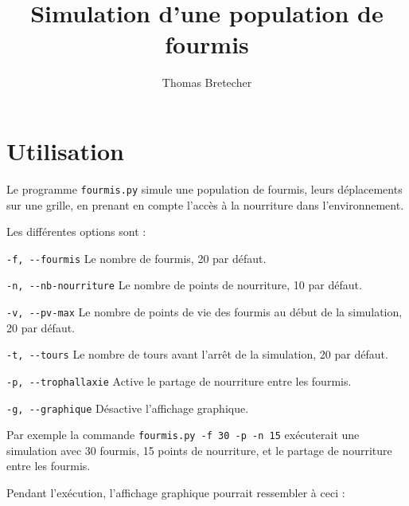 \documentclass[a4paper,12pt]{article}
\author{Thomas Bretecher}
\title{Simulation d'une population de fourmis}
\begin{document}
\maketitle

\section{Utilisation}

Le programme \verb|fourmis.py| simule une population de fourmis, leurs déplacements sur une grille, en prenant en compte l'accès à la nourriture dans l'environnement.

Les différentes options sont :

\begin{description}   

\item \verb|-f, --fourmis| Le nombre de fourmis, 20 par défaut.

\item \verb|-n, --nb-nourriture| Le nombre de points de nourriture, 10 par défaut.

\item \verb|-v, --pv-max| Le nombre de points de vie des fourmis au début de la simulation, 20 par défaut.

\item \verb|-t, --tours| Le nombre de tours avant l'arrêt de la simulation, 20 par défaut.

\item \verb|-p, --trophallaxie| Active le partage de nourriture entre les fourmis.

\item \verb|-g, --graphique| Désactive l'affichage graphique.

\end{description}

Par exemple la commande \verb|fourmis.py -f 30 -p -n 15| exécuterait une simulation avec 30 fourmis, 15 points de nourriture, et le partage de nourriture entre les fourmis.

Pendant l'exécution, l'affichage graphique pourrait ressembler à ceci :
\end{document}
